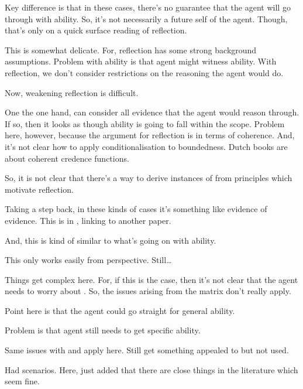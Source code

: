 \begin{note}
  Key difference is that in these cases, there's no guarantee that the agent will go through with ability.
  So, it's not necessarily a future self of the agent.
  Though, that's only on a quick surface reading of reflection.

  This is somewhat delicate.
  For, reflection has some strong background assumptions.
  Problem with ability is that agent might witness ability.
  With reflection, we don't consider restrictions on the reasoning the agent would do.

  Now, weakening reflection is difficult.

  One the one hand, can consider all evidence that the agent would reason through.
  If so, then it looks as though ability is going to fall within the scope.
  Problem here, however, because the argument for reflection is in terms of coherence.
  And, it's not clear how to apply conditionalisation to boundedness.
  Dutch books are about coherent credence functions.

  So, it is not clear that there's a way to derive instances of  from principles which motivate reflection.
\end{note}

\begin{note}
  Taking a step back, in these kinds of cases it's something like evidence of evidence.
  This is in \textcite[2]{Tal:2017uw}, linking to another paper.

  And, this is kind of similar to what's going on with ability.

  This only works easily from \AR{} perspective.
  Still\dots

  Things get complex here.
  For, if this is the case, then it's not clear that the agent needs to worry about .
  So, the issues arising from the matrix don't really apply.

  Point here is that the agent could go straight for general ability.

  Problem is that agent still needs to get specific ability.

  Same issues with \ESU{} and \nI{} apply here.
  Still get something appealed to but not used.
\end{note}

\begin{note}
  Had scenarios.
  Here, just added that there are close things in the literature which seem fine.
\end{note}


